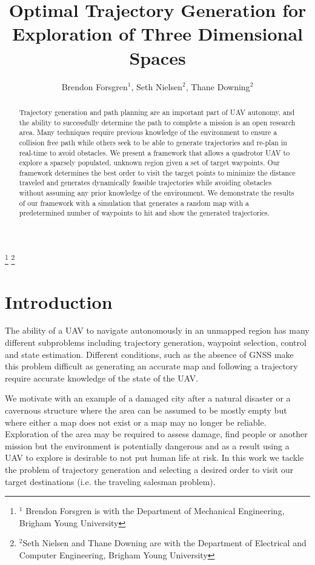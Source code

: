 \documentclass[letterpaper,conference, 10pt]{ieeeconf}
\begin{document}
\title{Optimal Trajectory Generation for Exploration of Three Dimensional Spaces}

\author{Brendon Forsgren$^1$, Seth Nielsen$^2$, Thane Downing$^2$}
\thanks{$^1$ Brendon Forsgren is with the Department of Mechanical Engineering, Brigham Young University}%
\thanks{$^{2} $Seth Nielsen and Thane Downing are with the Department of Electrical and Computer Engineering, Brigham Young University}%

\maketitle

\begin{abstract}
Trajectory generation and path planning are an important part of UAV autonomy, and the ability to successfully determine the path to complete a mission is an open research area. Many techniques require previous knowledge of the environment to ensure a collision free path while others seek to be able to generate trajectories and re-plan in real-time to avoid obstacles. We present a framework that allows a quadrotor UAV to explore a sparsely populated, unknown region given a set of target waypoints. Our framework determines the best order to visit the target points to minimize the distance traveled and generates dynamically feasible trajectories while avoiding obstacles without assuming any prior knowledge of the environment. We demonstrate the results of our framework with a simulation that generates a random map with a predetermined number of waypoints to hit and show the generated trajectories.
\end{abstract}

\section{Introduction}

The ability of a UAV to navigate autonomously in an unmapped region has many different subproblems including trajectory generation, waypoint selection, control and state estimation. Different conditions, such as the absence of GNSS make this problem difficult as generating an accurate map and following a trajectory require accurate knowledge of the state of the UAV.

We motivate with an example of a damaged city after a natural disaster or a cavernous structure where the area can be assumed to be mostly empty but where either a map does not exist or a map may no longer be reliable. Exploration of the area may be required to assess damage, find people or another mission but the environment is potentially dangerous and as a result using a UAV to explore is desirable to not put human life at risk. In this work we tackle the problem of trajectory generation and selecting a desired order to visit our target destinations (i.e. the traveling salesman problem).
\end{document}
